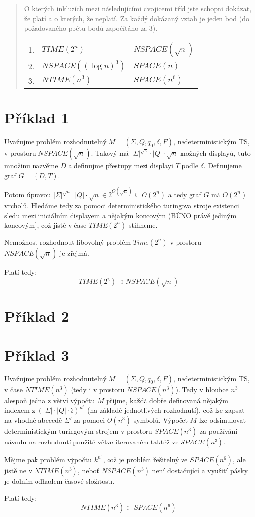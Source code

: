 \documentclass[a4paper,12pt]{article} %
\begin{document}
\begin{quote}
    O kterých inkluzích mezi následujícími dvojicemi tříd jste schopni dokázat, že platí a o kterých, že neplatí. Za každý dokázaný vztah je jeden bod (do požadovaného počtu bodů započítáno za 3).

    \begin{tabular}{l l l}
        
        1. & $TIME(2^n)$ & $NSPACE(\sqrt{n})$ \\
        2. & $NSPACE((\log n)^3)$ & $SPACE(n)$ \\
        3. & $NTIME(n^3)$ & $SPACE(n^6)$ \\
    \end{tabular}
\end{quote}

\section*{Příklad 1}

Uvažujme problém rozhodnutelný $M = (\Sigma, Q, q_0, \delta, F)$, nedeterministickým TS, v prostoru $NSPACE(\sqrt{n})$. Takový má $|\Sigma|^{\sqrt{n}} \cdot |Q| \cdot \sqrt{n}$ možných displayů, tuto množinu nazvěme $D$ a definujme přestupy mezi displayi $T$ podle $\delta$. Definujeme graf $G = (D, T)$.

Potom úpravou $|\Sigma|^{\sqrt{n}} \cdot |Q| \cdot \sqrt{n} \in 2^{O(\sqrt{n})} \subseteq O(2^n)$ a tedy graf $G$ má $O(2^n)$ vrcholů. Hledáme tedy za pomoci deterministického turingova stroje existenci sledu mezi iniciálním displayem a nějakým koncovým (BÚNO právě jediným koncovým), což jistě v čase $TIME(2^n)$ stihneme.

Nemožnost rozhodnout libovolný problém $Time(2^n)$ v prostoru $NSPACE(\sqrt{n})$ je zřejmá.

Platí tedy:
$$TIME(2^n) \supset NSPACE(\sqrt{n})$$

\section*{Příklad 2}

\section*{Příklad 3}

Uvažujme problém rozhodnutelný $M = (\Sigma, Q, q_0, \delta, F)$, nedeterministickým TS, v čase $NTIME(n^3)$ (tedy i v prostoru $NSPACE(n^3)$). Tedy v hloubce $n^3$ alespoň jedna z větví výpočtu $M$ přijme, každá dobře definovaná nějakým indexem z $(|\Sigma| \cdot |Q| \cdot 3)^{n^3}$ (na základě jednotlivých rozhodnutí), což lze zapsat na vhodné abecedě $\Sigma'$ za pomoci $O(n^3)$ symbolů. Výpočet $M$ lze odsimulovat deterministickým turingovým strojem v prostoru $SPACE(n^3)$ za používání návodu na rozhodnutí použité větve iterovaném taktéž ve $SPACE(n^3)$.

Mějme pak problém výpočtu $k^{n^6}$, což je problém řešitelný ve $SPACE(n^6)$, ale jistě ne v $NTIME(n^3)$, neboť $NSPACE(n^3)$ není dostačující a využití pásky je dolním odhadem časové složitosti.

Platí tedy:
$$NTIME(n^3) \subset SPACE(n^6)$$
\end{document}
